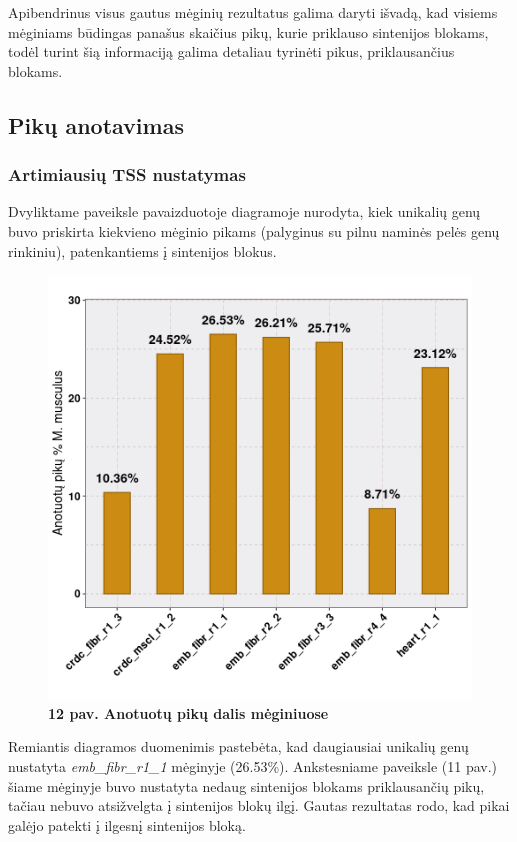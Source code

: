 \documentclass[12pt]{article}
\begin{document}
Apibendrinus visus gautus mėginių rezultatus galima daryti išvadą, kad visiems
mėginiams būdingas panašus skaičius pikų, kurie priklauso sintenijos blokams,
todėl turint šią informaciją galima detaliau tyrinėti pikus, priklausančius
blokams.

\subsection{Pikų anotavimas}
\subsubsection{Artimiausių TSS nustatymas}
Dvyliktame paveiksle pavaizduotoje diagramoje nurodyta, kiek unikalių genų buvo
priskirta kiekvieno mėginio pikams (palyginus su pilnu naminės pelės genų
rinkiniu), patenkantiems į sintenijos blokus.

\begin{figure}[htb]
    \begin{center}
        \includegraphics[width=0.7\linewidth]{../Figures/Unique_genes_MM.png}
        \vspace{-2\baselineskip}
        \caption*{\small\textbf{12 pav. Anotuotų pikų dalis mėginiuose}}
        \label{fig:birds}
    \end{center}
\end{figure}

Remiantis diagramos duomenimis pastebėta, kad daugiausiai unikalių genų
nustatyta \emph{emb\_\-fibr\_r1\_1} mėginyje (26.53\%). Ankstesniame paveiksle
(11 pav.) šiame mėginyje buvo nustatyta nedaug sintenijos blokams priklausančių
pikų, tačiau nebuvo atsižvelgta į sintenijos blokų ilgį. Gautas rezultatas rodo,
kad pikai galėjo patekti į ilgesnį sintenijos bloką.
\end{document}
